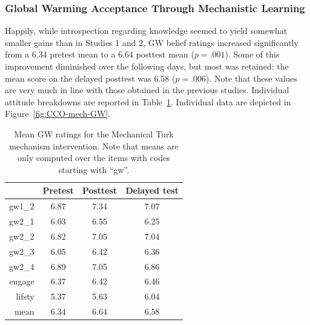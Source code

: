\subsubsection{Global Warming Acceptance Through Mechanistic Learning}

Happily, while introspection regarding knowledge seemed to yield somewhat
smaller gains than in Studies 1 and 2, GW belief ratings increased significantly
from a 6.34 pretest mean to a 6.64 posttest mean ($p=.001$). Some of this
improvement diminished over the following days, but most was retained: the mean
score on the delayed posttest was 6.58 ($p=.006$). Note that these values are
very much in line with those obtained in the previous studies. Individual
attitude breakdowns are reported in Table~\ref{table:CCO-mech-gw-means}.
Individual data are depicted in Figure~\ref{fig:CCO-mech-GW}.

\begin{table}
\caption{Mean GW ratings for the Mechanical Turk mechanism intervention. Note
    that means are only computed over the items with codes starting with
    “\textsf{gw}”.}
\label{table:CCO-mech-gw-means}
\centering
\begin{tabular}{>{\sffamily}rccc}
  \toprule
         & Pretest & Posttest & Delayed test \\ 
  \midrule
  gw1_2 & 6.87 & 7.34 & 7.07 \\ 
  gw2_1 & 6.03 & 6.55 & 6.25 \\ 
  gw2_2 & 6.82 & 7.05 & 7.04 \\ 
  gw2_3 & 6.05 & 6.42 & 6.36 \\ 
  gw2_4 & 6.89 & 7.05 & 6.86 \\ 
  engage & 6.37 & 6.42 & 6.46 \\ 
  lifsty & 5.37 & 5.63 & 6.04 \\ 
  \midrule
  mean & 6.34 & 6.64 & 6.58 \\
   \bottomrule
\end{tabular}
\end{table}

